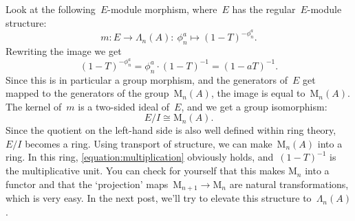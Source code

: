 Look at the following~$E$-module morphism, where~$E$ has the regular~$E$-module structure:
\begin{equation}
  m\colon E \to \Lambda_{n}(A): \ \phi_{n}^{a} \mapsto (1-T)^{-\phi_{n}^{a}}. 
\end{equation}
Rewriting the image we get
\begin{equation}
  (1-T)^{-\phi_{n}^{a}}= \phi_{n}^{a} \cdot (1-T)^{-1} =(1-aT)^{-1}. 
\end{equation}
Since this is in particular a group morphism, and the generators of~$E$ get mapped to the generators of the group~$\mathrm{M}_{n}(A)$, the image is equal to~$\mathrm{M}_{n}(A)$. The kernel of~$m$ is a two-sided ideal of~$E$, and we get a group isomorphism:
\begin{equation}
  E/I \cong \mathrm{M}_{n}(A). 
\end{equation}
Since the quotient on the left-hand side is also well defined within ring theory,~$E/I$ becomes a ring. Using transport of structure, we can make~$\mathrm{M}_{n}(A)$ into a ring. In this ring, \eqref{equation:multiplication} obviously holds, and~$(1-T)^{-1}$ is the multiplicative unit. You can check for yourself that this makes $\mathrm{M}_{n}$ into a functor and that the `projection' maps~$\mathrm{M}_{n+1} \to \mathrm{M}_{n}$ are natural transformations, which is very easy. In the next post, we'll try to elevate this structure to~$\Lambda_{n}(A)$.

\begin{table}[tp]
  \centering
  \noindent{}
  \caption{All structures involved}
  \label{table:witt-vector-objects-overview}
\end{table}
